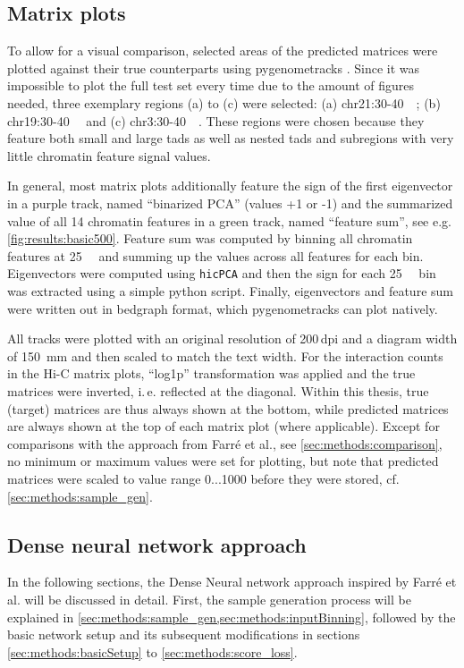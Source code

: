 \subsection{Matrix plots} \label{sec:methods:matrix_plots}
To allow for a visual comparison, selected areas of the predicted matrices were plotted against their true counterparts using pygenometracks \cite{LopezDelisle2020}.
Since it was impossible to plot the full test set every time due to the amount of figures needed, 
three exemplary regions (a) to (c) were selected: (a) chr21:30-\SI{40}{\mega\bp}; (b) chr19:30-\SI{40}{\mega\bp} and (c) chr3:30-\SI{40}{\mega\bp}.
These regions were chosen because they feature both small and large \acrshort{tad}s as well as nested \acrshort{tad}s and subregions with very little chromatin feature signal values.

In general, most matrix plots additionally feature the sign of the first eigenvector in a purple track, named ``binarized PCA'' (values +1 or -1)
and the summarized value of all 14 chromatin features in a green track, named ``feature sum'', see e.g. \cref{fig:results:basic500}.
Feature sum was computed by binning all chromatin features at \SI{25}{\kilo\bp} and 
summing up the values across all features for each bin.
Eigenvectors were computed using \texttt{hicPCA} \cite{Wolff2018} and then the sign for each \SI{25}{\kilo\bp} bin was extracted using 
a simple python script. Finally, eigenvectors and feature sum were written out in bedgraph format, which pygenometracks can plot natively.

All tracks were plotted with an original resolution of 200\,dpi and a diagram width of \SI{150}{\mm} and then scaled to match the text width.
For the interaction counts in the Hi-C matrix plots, ``log1p'' transformation was applied and the true matrices were inverted,
i.\,e. reflected at the diagonal. Within this thesis, true (target) matrices are thus always shown at the bottom, while predicted matrices are always shown at the top
of each matrix plot (where applicable).
Except for comparisons with the approach from Farr\'e et al., see \cref{sec:methods:comparison},
no minimum or maximum values were set for plotting, but note that predicted matrices were scaled to value range 0...1000 
before they were stored, cf. \cref{sec:methods:sample_gen}.

\subsection{Dense neural network approach} \label{sec:methods:dnn}
In the following sections, the Dense Neural network approach inspired by Farr\'e et al. \cite{Farre2018a}
will be discussed in detail.
First, the sample generation process will be explained in \cref{sec:methods:sample_gen,sec:methods:inputBinning}, 
followed by the basic network setup and its subsequent modifications in sections \ref{sec:methods:basicSetup} to \ref{sec:methods:score_loss}.

